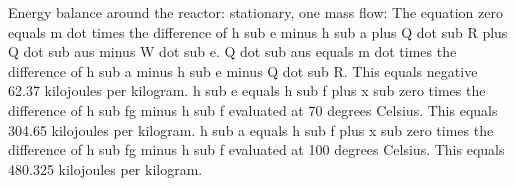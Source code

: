 Energy balance around the reactor:
stationary, one mass flow:
The equation zero equals m dot times the difference of h sub e minus h sub a plus Q dot sub R plus Q dot sub aus minus W dot sub e.
Q dot sub aus equals m dot times the difference of h sub a minus h sub e minus Q dot sub R.
This equals negative 62.37 kilojoules per kilogram.
h sub e equals h sub f plus x sub zero times the difference of h sub fg minus h sub f evaluated at 70 degrees Celsius.
This equals 304.65 kilojoules per kilogram.
h sub a equals h sub f plus x sub zero times the difference of h sub fg minus h sub f evaluated at 100 degrees Celsius.
This equals 480.325 kilojoules per kilogram.